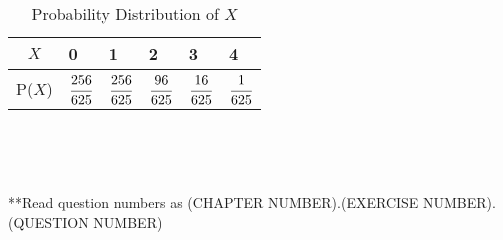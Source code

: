 \documentclass[journal,12pt,twocolumn]{IEEEtran}
\begin{document}
\begin{enumerate}[label=13.\arabic{enumi}.\arabic{enumii}]
\begin{table}[h!]
			\begin{tabular}[20pt]{|>{}c|a|a|a|a|a|} \hline
			$X$&0&1&2&3&4 \T \\ \hline
			P($X$)&$\cfrac{256}{625}$&$\cfrac{256}{625}$&$\cfrac{96}{625}$&$\cfrac{16}{625}$&$\cfrac{1}{625}$\\[1.5ex] \hline
		\end{tabular}\\[2ex]
		\caption{Probability Distribution of $X$}
	\end{table}\\
\end{enumerate}
\footnotesize{**Read question numbers as (CHAPTER NUMBER).(EXERCISE NUMBER).(QUESTION NUMBER)}
\end{document}
